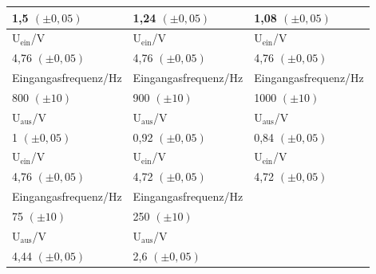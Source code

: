 \documentclass[12pt]{scrartcl}
\begin{document}
\begin{table}[H]
\begin{center}
\begin{tabular}{|l|l|l|}
1,5 $(\pm 0,05)$ & 1,24 $(\pm 0,05)$ & 1,08 $(\pm 0,05)$ \\ \hline
U$_\text{ein}$/V & U$_\text{ein}$/V & U$_\text{ein}$/V \\ \hline
4,76 $(\pm 0,05)$ & 4,76 $(\pm 0,05)$ & 4,76 $(\pm 0,05)$ \\ \hline \hline
Eingangasfrequenz/Hz & Eingangasfrequenz/Hz & Eingangasfrequenz/Hz \\ \hline
800 $(\pm 10)$ & 900 $(\pm 10)$ & 1000 $(\pm 10)$ \\ \hline
U$_\text{aus}$/V & U$_\text{aus}$/V & U$_\text{aus}$/V \\ \hline
1 $(\pm 0,05)$ & 0,92 $(\pm 0,05)$ & 0,84 $(\pm 0,05)$ \\ \hline
U$_\text{ein}$/V & U$_\text{ein}$/V & U$_\text{ein}$/V \\ \hline
4,76 $(\pm 0,05)$ & 4,72 $(\pm 0,05)$ & 4,72 $(\pm 0,05)$ \\ \hline \hline
Eingangasfrequenz/Hz & Eingangasfrequenz/Hz &  \\ \hline
75 $(\pm 10)$ & 250 $(\pm 10)$ &  \\ \hline
U$_\text{aus}$/V & U$_\text{aus}$/V &  \\ \hline
4,44 $(\pm 0,05)$ & 2,6 $(\pm 0,05)$ &  \\ \hline
\end{tabular}
\end{center}
\label{tab:2.3}
\end{table}
\end{document}
